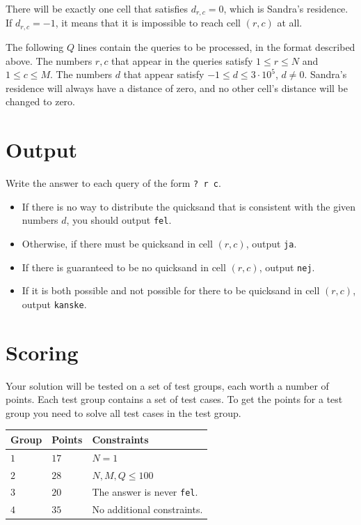 There will be exactly one cell that satisfies $d_{r, c} = 0$, which is Sandra's residence. If
$d_{r, c} = -1$, it means that it is impossible to reach cell $(r, c)$ at all.

The following $Q$ lines contain the queries to be processed, in the format described above. 
The numbers $r, c$ that appear in the queries satisfy $1 \leq r \leq N$ and $1 \leq c \leq M$. 
The numbers $d$ that appear satisfy $-1 \leq d \leq 3 \cdot 10^5$, $d \neq 0$. 
Sandra's residence will always have a distance of zero, and no other cell's distance will be changed to zero.

\section*{Output}

Write the answer to each query of the form \verb|? r c|.
\begin{itemize}
  \item If there is no way to distribute the quicksand that is consistent with the given numbers $d$, you
  should output \verb|fel|.
  \item Otherwise, if there must be quicksand in cell $(r, c)$, output \verb|ja|.
  \item If there is guaranteed to be no quicksand in cell $(r, c)$, output \verb|nej|.
  \item If it is both possible and not possible for there to be quicksand in cell $(r, c)$, output \verb|kanske|.
\end{itemize}

\section*{Scoring}
Your solution will be tested on a set of test groups, each worth a number of points. Each test group contains
a set of test cases. To get the points for a test group you need to solve all test cases in the test group.

\noindent
\begin{tabular}{| l | l | p{12cm} |}
  \hline
  \textbf{Group} & \textbf{Points} & \textbf{Constraints} \\ \hline
  $1$    & $17$        & $N = 1$ \\ \hline
  $2$    & $28$        & $N,M,Q \leq 100$ \\ \hline
  $3$    & $20$        & The answer is never \verb|fel|. \\ \hline
  $4$    & $35$        & No additional constraints. \\ \hline
\end{tabular}

